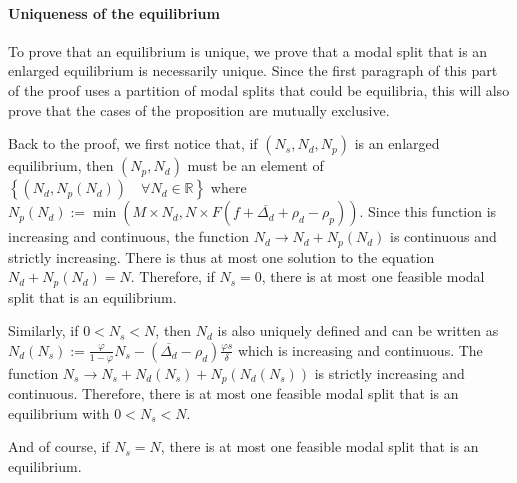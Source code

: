 \documentclass[english, a4paper]{article}
\theoremstyle{plain}
\theoremstyle{definition}
\theoremstyle{remark}
\begin{document}
\paragraph{Uniqueness of the equilibrium}
To prove that an equilibrium is unique, we prove that a modal split that is an enlarged equilibrium is necessarily unique. Since the first paragraph of this part of the proof uses a partition of modal splits that could be equilibria, this will also prove that the cases of the proposition are mutually exclusive.

Back to the proof, we first notice that, if $(N_s, N_d, N_p)$ is an enlarged equilibrium, then $(N_p, N_d)$ must be an element of $\left\{ (N_d, N_p(N_d)) \quad \forall N_d\in\mathbb{R} \right\}$ where $N_p(N_d) := \min (M\times N_d, N \times F(f + \overline{\Delta _d} + \rho _d - \rho _p))$\footnotemark. Since this function is increasing and continuous, the function $N_d \longrightarrow N_d + N_p(N_d)$ is continuous and strictly increasing. There is thus at most one solution to the equation $N_d + N_p(N_d) = N$. Therefore, if $N_s = 0$, there is at most one feasible modal split that is an equilibrium.

Similarly, if $0 < N_s < N$, then $N_d$ is also uniquely defined and can be written as $N_d (N_s) := \frac{\varphi}{1-\varphi}N_s - (\overline{\Delta _d} - \rho _d)\frac{\varphi s}{\delta}$ which is increasing and continuous. The function $N_s \longrightarrow N_s + N_d(N_s) + N_p(N_d(N_s))$ is strictly increasing and continuous. Therefore, there is at most one feasible modal split that is an equilibrium with $0 < N_s < N$.

And of course, if $N_s = N$, there is at most one feasible modal split that is an equilibrium.
    
\end{document}
